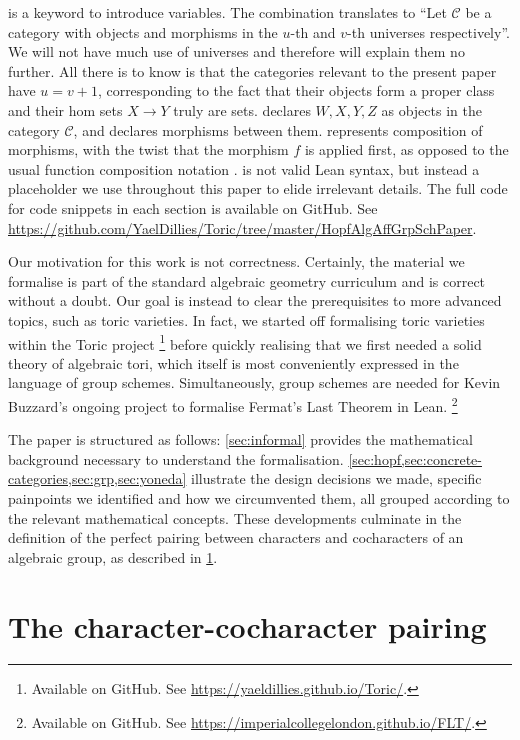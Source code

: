 \documentclass{article}
\newcommand{\mcC}{\mathcal C}
\begin{document}
 is a keyword to introduce variables.
The combination  translates to ``Let $\mcC$ be a category with objects and morphisms in the $u$-th and $v$-th universes respectively''.
We will not have much use of universes and therefore will explain them no further.
All there is to know is that the categories relevant to the present paper have $u = v + 1$, corresponding to the fact that their objects form a proper class and their hom sets $X \to Y$ truly are sets.
 declares $W, X, Y, Z$ as objects in the category $\mcC$, and  declares morphisms between them.
 represents composition of morphisms, with the twist that the morphism $f$ is applied first, as opposed to the usual function composition notation .
 is not valid Lean syntax, but instead a placeholder we use throughout this paper to elide irrelevant details.
The full code for code snippets in each section is available on GitHub. See \url{https://github.com/YaelDillies/Toric/tree/master/HopfAlgAffGrpSchPaper}.

Our motivation for this work is not correctness.
Certainly, the material we formalise is part of the standard algebraic geometry curriculum and is correct without a doubt.
Our goal is instead to clear the prerequisites to more advanced topics, such as toric varieties.
In fact, we started off formalising toric varieties within the Toric project
\footnote{Available on GitHub. See \url{https://yaeldillies.github.io/Toric/}.}
before quickly realising that we first needed a solid theory of algebraic tori, which itself is most conveniently expressed in the language of group schemes.
Simultaneously, group schemes are needed for Kevin Buzzard's ongoing project to formalise Fermat's Last Theorem in Lean.
\footnote{Available on GitHub. See \url{https://imperialcollegelondon.github.io/FLT/}.}

The paper is structured as follows:
\cref{sec:informal} provides the mathematical background necessary to understand the formalisation.
\cref{sec:hopf,sec:concrete-categories,sec:grp,sec:yoneda} illustrate the design decisions we made, specific painpoints we identified and how we circumvented them, all grouped according to the relevant mathematical concepts.
These developments culminate in the definition of the perfect pairing between characters and cocharacters of an algebraic group, as described in \cref{sec:char-cochar}.


\section{The character-cocharacter pairing}\label{sec:char-cochar}
\end{document}
